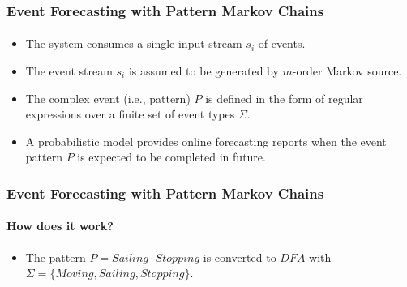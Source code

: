 \frame
{
  \frametitle{ Event Forecasting with Pattern Markov
 	Chains  }
	\framesubtitle{\citep{alevizos2017event}}
  \begin{itemize}[]
  	\item<1-> The system consumes a single input stream $s_i$ of events.
  	\item<1-> The event stream $s_i$ is assumed to be generated by  $m$-order Markov source.
  \item<1-> The complex event (i.e., pattern) $P$ is defined in the form of regular expressions over a finite set of event types $\Sigma$.

  \item<1-> A probabilistic model provides online forecasting reports when the event pattern $P$ is expected to be completed in future. 
   
  \end{itemize}
}

\frame
{
	\frametitle{Event Forecasting with Pattern Markov
		Chains  }
	\framesubtitle{ How does it work?}
		\begin{itemize}
		\item<only@1> The pattern $P=Sailing\cdot Stopping$ is converted to $DFA$ with $\Sigma=\{Moving,Sailing,Stopping\}$. 
		
	
			\end{itemize}
}



